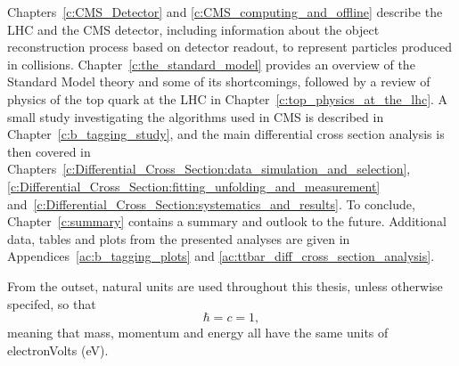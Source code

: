 Chapters~\ref{c:CMS_Detector} and \ref{c:CMS_computing_and_offline} describe the LHC and the CMS detector,
including information about the object reconstruction process based on detector readout, to represent
particles produced in collisions. Chapter~\ref{c:the_standard_model} provides an overview of the Standard
Model theory and some of its shortcomings, followed by a review of physics of the top quark at the LHC in
Chapter~\ref{c:top_physics_at_the_lhc}. A small study investigating the \btagging algorithms used in CMS is
described in Chapter~\ref{c:b_tagging_study}, and the main \ttbar differential cross section analysis is then
covered in Chapters~\ref{c:Differential_Cross_Section:data_simulation_and_selection},
\ref{c:Differential_Cross_Section:fitting_unfolding_and_measurement}
and~\ref{c:Differential_Cross_Section:systematics_and_results}. To conclude, Chapter~\ref{c:summary} contains
a summary and outlook to the future. Additional data, tables and plots from the presented analyses are given
in Appendices~\ref{ac:b_tagging_plots} and \ref{ac:ttbar_diff_cross_section_analysis}.

From the outset, natural units are used throughout this thesis, unless otherwise specifed, so that
\begin{equation}
\hbar = c = 1,
\end{equation}
meaning that mass, momentum and energy all have the same units of electronVolts (eV).